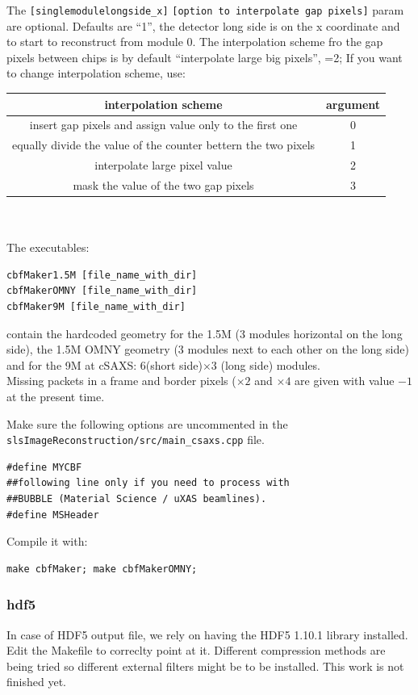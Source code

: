 \documentclass{article}
\begin{document}
The {\tt{[singlemodulelongside\_x]}} {\tt{[option to interpolate gap pixels]}} param are optional. Defaults are ``1'', the detector long side is on the x coordinate and to start to reconstruct from module 0.
The interpolation scheme fro the gap pixels between chips is by default ``interpolate large big pixels'', =2;
If you want to change interpolation scheme, use:\\
\begin{tabular}{|c|c|}
\hline
interpolation scheme & argument\\
\hline
insert gap pixels and assign value only to the first one  & 0\\
\hline
equally divide the value of the counter bettern the two pixels & 1\\
\hline
interpolate large pixel value & 2\\
\hline
mask the value of the two gap pixels & 3\\
\hline
\end{tabular}
\ \\
\ \\ 
The executables: 
\begin{verbatim}
cbfMaker1.5M [file_name_with_dir]
cbfMakerOMNY [file_name_with_dir]
cbfMaker9M [file_name_with_dir]
\end{verbatim}
contain the hardcoded geometry for the 1.5M (3 modules horizontal on the long side), the 1.5M OMNY geometry (3 modules next to each other on the long side) and for the 9M at cSAXS: 6(short side)$\times$3 (long side) modules.\\ 
Missing packets in a frame and border pixels ($\times 2$ and $\times 4$ are given with value $-1$ at the present time.

Make sure the following options are uncommented in the {\tt{slsImageReconstruction/src/main\_csaxs.cpp}} file. 
\begin{verbatim}
#define MYCBF
##following line only if you need to process with 
##BUBBLE (Material Science / uXAS beamlines).
#define MSHeader 
\end{verbatim}
Compile it with: 
\begin{verbatim}
make cbfMaker; make cbfMakerOMNY;
\end{verbatim}

\subsubsection{hdf5}
In case of HDF5 output file, we rely on having the HDF5 1.10.1 library installed. Edit the Makefile to correclty point at it. Different compression methods are being tried so different external filters might be to be installed. This work is not finished yet.
\end{document}
